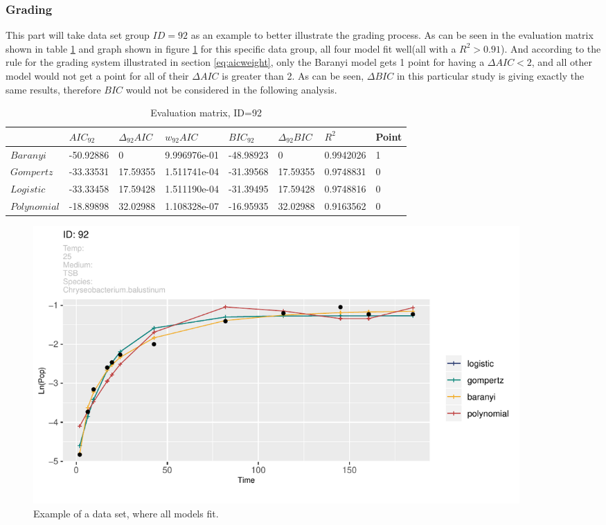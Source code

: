 \documentclass[11pt]{article}
\begin{document}
\FloatBarrier

\subsubsection{Grading}
This part will take data set group $\mathit{ID}=92$ as an example to better illustrate the grading process. As can be seen in the evaluation matrix shown in table \ref{tab: evaluation} and graph shown in figure \ref{fig:gooddata} for this specific data group, all four model fit well(all with a $R^2>0.91$). And according to the rule for the grading system illustrated in section \ref{eq:aicweight}, only the Baranyi model gets 1 point for having a $\Delta AIC < 2$, and all other model would not get a point for all of their $\Delta AIC$ is greater than 2. As can be seen, $\Delta BIC$ in this particular study is giving exactly the same results, therefore $BIC$ would not be considered in the following analysis.

\FloatBarrier
\begin{table}[!htbp]
\begin{tabularx}{\linewidth}{X X X X X X X X}
\toprule & ${AIC}_\mathit{92}$ & ${\Delta}_\mathit{92} AIC$ & ${w}_\mathit{92} AIC$ &  ${BIC}_\mathit{92}$ & ${\Delta}_\mathit{92} BIC$ & $R^2$ & Point\\
\midrule
$Baranyi$ & -50.92886 & 0 & 9.996976e-01 & -48.98923 & 0 & 0.9942026 & 1 \\
$Gompertz$ & -33.33531 & 17.59355 & 1.511741e-04 & -31.39568 & 17.59355 & 0.9748831 & 0 \\
$Logistic$ & -33.33458 & 17.59428 & 1.511190e-04 & -31.39495 & 17.59428 & 0.9748816 & 0 \\
$Polynomial$ & -18.89898 & 32.02988 & 1.108328e-07 & -16.95935 & 32.02988 & 0.9163562 & 0\\
\bottomrule
\end{tabularx}
\caption{Evaluation matrix, ID=92}
\label{tab: evaluation}
\end{table}          
\FloatBarrier

\FloatBarrier
\begin{figure}[!htbp]
    \centering
    \includegraphics[width=0.9\textwidth]{../Results/allPlots/ 92 .pdf}
    \caption{Example of a data set, where all models fit.}
    \label{fig:gooddata}
\end{figure}
\FloatBarrier
\end{document}

